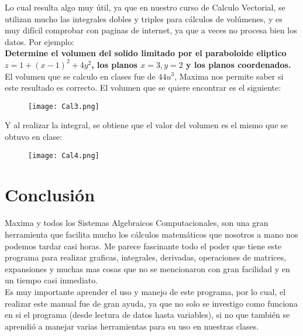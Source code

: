 \documentclass[12pt]{article}
\begin{document}
Lo cual resulta algo muy útil, ya que en nuestro curso de Calculo Vectorial, se utilizan mucho las integrales dobles y triples para cálculos de volúmenes, y es muy difícil comprobar con paginas de internet, ya que a veces no procesa bien los datos. Por ejemplo: \\

\noindent \textbf{Determine el volumen del solido limitado por el paraboloide eliptico $z= 1 +(x-1)^2 + 4y^2$, los planos $x=3, y=2$ y los planos coordenados.} \\

El volumen que se calculo en clases fue de $44 u^3$, Maxima nos permite saber si este resultado es correcto. El volumen que se quiere encontrar es el siguiente:

\begin{figure}[h!]
    \centering
\texttt{[image: Cal3.png]}
\end{figure}

Y al realizar la integral, se obtiene que el valor del volumen es el mismo que se obtuvo en clase:

\begin{figure}[h!]
    \centering
\texttt{[image: Cal4.png]}
\end{figure}

\section{Conclusión}
 Maxima y todos los Sistemas Algebraicos Computacionales, son una gran herramienta que facilita mucho los cálculos matemáticos que nosotros a mano nos podemos tardar casi horas. Me parece fascinante todo el poder que tiene este programa para realizar graficas, integrales, derivadas, operaciones de matrices, expansiones y muchas mas cosas que no se mencionaron con gran facilidad y en un tiempo casi inmediato. \\
 
Es muy importante aprender el uso y manejo de este programa, por lo cual, el realizar este manual fue de gran ayuda, ya que no solo se investigo como funciona en si el programa (desde lectura de datos hasta variables), si no que también se aprendió a manejar varias herramientas para su uso en nuestras clases. 
\end{document}
